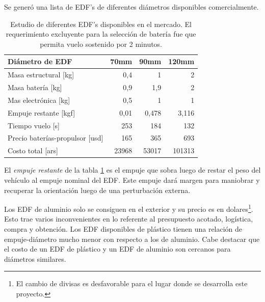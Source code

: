 \medskip

Se generó una lista de EDF's de diferentes diámetros disponibles comercialmente.

\begin{table}[!ht]
    \centering
    \begin{tabular}{l|r|r|r}
Diámetro de EDF    & \multicolumn{1}{l|}{70mm} & \multicolumn{1}{l|}{90mm} & \multicolumn{1}{l}{120mm} \\ \hline
    Masa estructural {[}kg{]}           & 0,4                       & 1                         & 2                          \\ \hline
    Masa batería       {[}kg{]}                 & 0,9                       & 1,9                       & 2                          \\ \hline
    Mas electrónica {[}kg{]}            & 0,5                       & 1                         & 1                          \\ \hline
    Empuje restante {[}kgf{]}           & 0,01                      & 0,478                     & 3,116                      \\ \hline
    Tiempo vuelo {[}s{]}                & 253              & 184              & 132                \\ \hline
    Precio baterías-propulsor {[}usd{]} & 165                   & 365                   & 693                   \\ \hline
    Costo total {[}ars{]}               & 23968              & 53017              & 101313                 \\ \hline
    \end{tabular}
    \caption{Estudio de diferentes EDF's disponibles en el mercado. El requerimiento excluyente para la selección de batería fue que permita vuelo sostenido por 2 minutos.}
    \label{tab:edfseleccion}
\end{table}


El \textit{empuje restante} de la tabla \ref{tab:edfseleccion} es el empuje que sobra luego de restar el peso del vehículo al empuje nominal del EDF. Este empuje dará margen para maniobrar y recuperar la orientación luego de una perturbación externa.

\medskip

Los EDF de aluminio solo se consiguen en el exterior y su precio es en dolares\footnote{El cambio de divisas es desfavorable para el lugar donde se desarrolla este proyecto.}. Esto trae varios inconvenientes en lo referente al presupuesto acotado, logística, compra y obtención. Los EDF
disponibles de plástico tienen una relación de empuje-diámetro mucho menor con respecto a
los de aluminio. Cabe destacar que el costo de un EDF de plástico y un EDF de aluminio son cercanos para diámetros similares.

